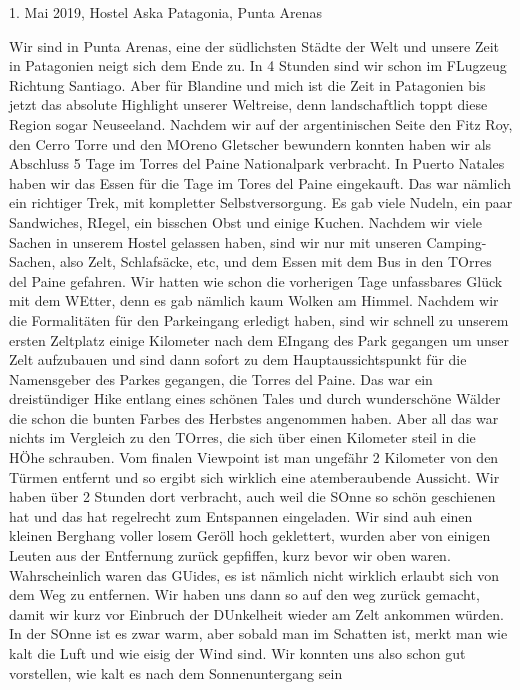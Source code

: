 \documentclass[11pt]{book}
\begin{document}
1. Mai 2019, Hostel Aska Patagonia, Punta Arenas

Wir sind in Punta Arenas, eine der südlichsten Städte der Welt und unsere Zeit in Patagonien neigt sich dem Ende zu. In 4 Stunden 
sind wir schon im FLugzeug Richtung Santiago. Aber für Blandine und mich ist die Zeit in Patagonien bis jetzt das absolute Highlight 
unserer Weltreise, denn landschaftlich toppt diese Region sogar Neuseeland. Nachdem wir auf der argentinischen Seite den Fitz Roy, 
den Cerro Torre und den MOreno Gletscher bewundern konnten haben wir als Abschluss 5 Tage im Torres del Paine Nationalpark verbracht. 
In Puerto Natales haben wir das Essen für die Tage im Tores del Paine eingekauft. Das war nämlich ein richtiger Trek, mit kompletter 
Selbstversorgung. Es gab viele Nudeln, ein paar Sandwiches, RIegel, ein bisschen Obst und einige Kuchen. Nachdem wir viele Sachen 
in unserem Hostel gelassen haben, sind wir nur mit unseren Camping-Sachen, also Zelt, Schlafsäcke, etc, und dem Essen mit dem 
Bus in den TOrres del Paine gefahren. Wir hatten wie schon die vorherigen Tage unfassbares Glück mit dem WEtter, denn es gab nämlich 
kaum Wolken am Himmel. Nachdem wir die Formalitäten für den Parkeingang erledigt haben, sind wir schnell zu unserem ersten Zeltplatz 
einige Kilometer nach dem EIngang des Park gegangen um unser Zelt aufzubauen und sind dann sofort zu dem Hauptaussichtspunkt für die 
Namensgeber des Parkes gegangen, die Torres del Paine. Das war ein dreistündiger Hike entlang eines schönen Tales und durch wunderschöne 
Wälder die schon die bunten Farbes des Herbstes angenommen haben. Aber all das war nichts im Vergleich zu den TOrres, die sich 
über einen Kilometer steil in die HÖhe schrauben. Vom finalen Viewpoint ist man ungefähr 2 Kilometer von den Türmen entfernt und 
so ergibt sich wirklich eine atemberaubende Aussicht. Wir haben über 2 Stunden dort verbracht, auch weil die SOnne so schön 
geschienen hat und das hat regelrecht zum Entspannen eingeladen. Wir sind auh einen kleinen Berghang voller losem Geröll hoch geklettert, 
wurden aber von einigen Leuten aus der Entfernung zurück gepfiffen, kurz bevor wir oben waren. Wahrscheinlich waren das GUides, es ist 
nämlich nicht wirklich erlaubt sich von dem Weg zu entfernen. Wir haben uns dann so auf den weg zurück gemacht, damit wir kurz vor 
Einbruch der DUnkelheit wieder am Zelt ankommen würden. In der SOnne ist es zwar warm, aber sobald man im Schatten ist, merkt man 
wie kalt die Luft und wie eisig der Wind sind. Wir konnten uns also schon gut vorstellen, wie kalt es nach dem Sonnenuntergang sein 
\end{document}
